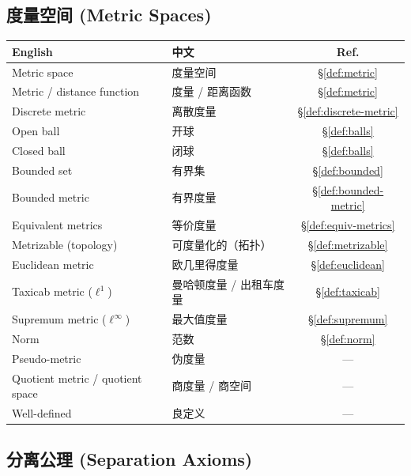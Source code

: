 \documentclass{article}
\begin{document}
\subsection*{度量空间 (Metric Spaces)}

\begin{tabular}{@{}lp{7.5cm}c@{}}
  \hline
  \textbf{English} & \textbf{中文} & \textbf{Ref.} \\
  \hline
  Metric space                     & 度量空间 & \S\ref{def:metric} \\
  Metric / distance function       & 度量 / 距离函数 & \S\ref{def:metric} \\
  Discrete metric                  & 离散度量 & \S\ref{def:discrete-metric} \\
  Open ball                        & 开球 & \S\ref{def:balls} \\
  Closed ball                      & 闭球 & \S\ref{def:balls} \\
  Bounded set                      & 有界集 & \S\ref{def:bounded} \\
  Bounded metric                   & 有界度量 & \S\ref{def:bounded-metric} \\
  Equivalent metrics               & 等价度量 & \S\ref{def:equiv-metrics} \\
  Metrizable (topology)            & 可度量化的（拓扑）& \S\ref{def:metrizable} \\
  Euclidean metric                 & 欧几里得度量 & \S\ref{def:euclidean} \\
  Taxicab metric ($\ell^1$)        & 曼哈顿度量 / 出租车度量 & \S\ref{def:taxicab} \\
  Supremum metric ($\ell^\infty$)  & 最大值度量 & \S\ref{def:supremum} \\
  Norm                             & 范数 & \S\ref{def:norm} \\
  Pseudo-metric                    & 伪度量 & --- \\
  Quotient metric / quotient space & 商度量 / 商空间 & --- \\
  Well-defined                     & 良定义 & --- \\
  \hline
\end{tabular}

\subsection*{分离公理 (Separation Axioms)}
\end{document}
